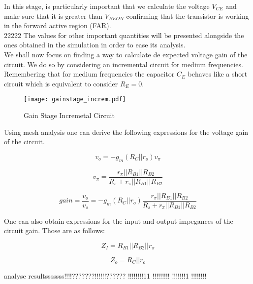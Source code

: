 In this stage, is particularly important that we calculate the voltage $V_{CE}$ and make sure that it is greater than $V_{BEON}$ confirming that the transistor is working in the forward active region (FAR).\\

22222 The values for other important quantities will be presented alongside the ones obtained in the simulation in order to ease its analysis.\\

We shall now focus on finding a way to calculate de expected voltage gain of the circuit. We do so by considering an incremental circuit for medium frequencies. Remembering that for medium frequencies the capacitor $C_E$ behaves like a short circuit which is equivalent to consider $R_E=0$.

\begin{figure}[h!]
\centering
\texttt{[image: gainstage\_increm.pdf]}
\caption{Gain Stage Incremetal Circuit}
\label{fig:gain stage incremetal circuit}
\end{figure}

Using mesh analysis one can derive the following expressions for the voltage gain of the circuit.

\begin{equation}
v_o=-g_m(R_C||r_o)v_{\pi}
\end{equation}

\begin{equation}
v_{\pi}=\frac{r_{\pi}||R_{B1}||R_{B2}}{R_s+r_{\pi}||R_{B1}||R_{B2}}
\end{equation}

\begin{equation}
gain=\frac{v_o}{v_s}=-g_m(R_C||r_o)\frac{r_{\pi}||R_{B1}||R_{B2}}{R_s+r_{\pi}||R_{B1}||R_{B2}}
\end{equation}

One can also obtain expressions for the input and output impegances of the circuit gain. Those are as follows:


\begin{equation}
Z_I=R_{B1}||R_{B2}||r_{\pi}
\end{equation}

\begin{equation}
Z_o=R_C||r_o
\end{equation}



analyse resultsssssss!!!!???????!!!!!!??????
!!!!!!!!11
!!!!!!!!!
!!!!!!!1
!!!!!!!!



